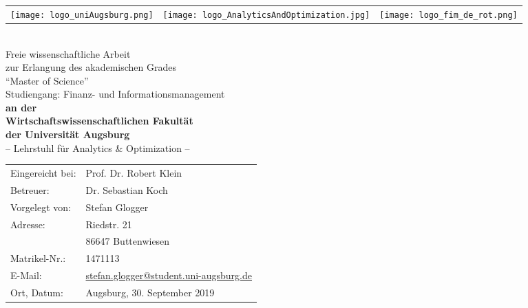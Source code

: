 \begin{titlepage}
\begin{spacing}{1.0}
	
\begin{tabularx}{\textwidth}{LYR}
	\texttt{[image: logo\_uniAugsburg.png]} &
	\texttt{[image: logo\_AnalyticsAndOptimization.jpg]} &
	\texttt{[image: logo\_fim\_de\_rot.png]}
\end{tabularx}
\vspace*{1.2cm}
\begin{center}
	{\huge \textbf{\Title\\}} 
\vspace*{1.2cm}
{\Large Freie wissenschaftliche Arbeit \\
zur Erlangung des akademischen Grades\\
\enquote{Master of Science}\\
Studiengang: Finanz- und Informationsmanagement\\
} 
\vspace*{.8cm}
{\Large \textbf{an der\\
Wirtschaftswissenschaftlichen Fakultät\\
der Universität Augsburg\\
}}
\vspace*{.8cm}
{\Large – Lehrstuhl für Analytics \& Optimization –\\}
\vspace*{.8cm}
{
\begin{tabular}{ll}
Eingereicht bei:& Prof. Dr. Robert Klein\\
Betreuer:& 			Dr. Sebastian Koch\\
Vorgelegt von:&	Stefan Glogger\\
Adresse:&			Riedstr. 21\\
&						86647 Buttenwiesen\\
Matrikel-Nr.:&		1471113\\
E-Mail:&				\href{mailto:stefan.glogger@student.uni-augsburg.de}{stefan.glogger@student.uni-augsburg.de}\\
Ort, Datum:&		Augsburg, 30. September 2019 \\
\end{tabular}
}
\end{center}

\end{spacing}

\end{titlepage}
